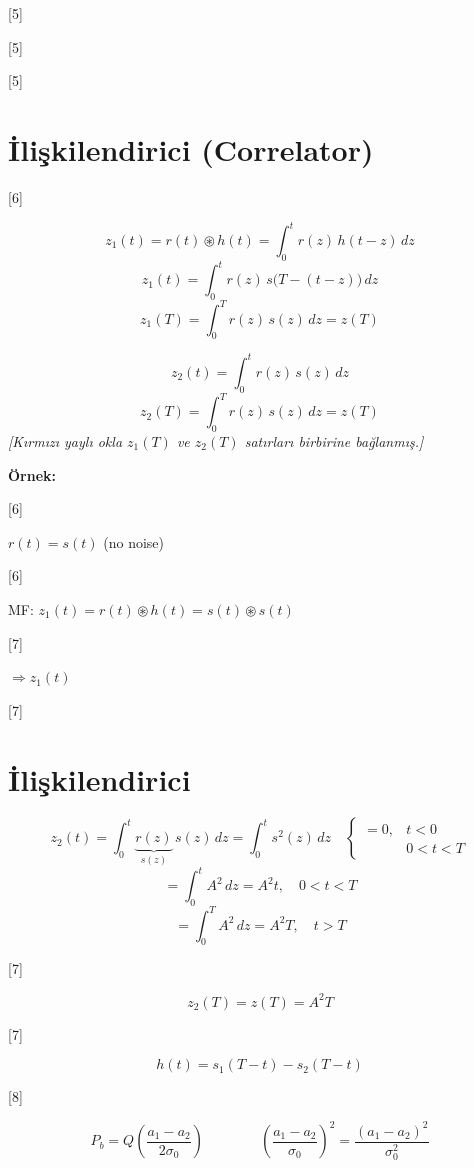\documentclass[11pt,a4paper]{article}
\begin{document}
[5]

[5]

[5]

\section{İlişkilendirici (Correlator)}

[6]

\[ z_1(t)=r(t)\circledast h(t)=\int_0^t r(z)\,h(t-z)\,dz \]
\[ z_1(t)=\int_0^t r(z)\,s\bigl(T-(t-z)\bigr)\,dz \]
\[ z_1(T)=\int_0^T r(z)\,s(z)\,dz=z(T) \]

\[ z_2(t)=\int_0^t r(z)\,s(z)\,dz \]
\[ z_2(T)=\int_0^T r(z)\,s(z)\,dz=z(T) \]
\textit{[Kırmızı yaylı okla $z_1(T)$ ve $z_2(T)$ satırları birbirine bağlanmış.]}

\textbf{Örnek:}

[6]

$r(t)=s(t)$ \qquad (no noise)

[6]

MF: $z_1(t)=r(t)\circledast h(t)=s(t)\circledast s(t)$

[7]

$\Rightarrow z_1(t)$

[7]

\section{İlişkilendirici}
\[ z_2(t)=\int_0^t \underbrace{r(z)}_{s(z)}\,s(z)\,dz=\int_0^t s^2(z)\,dz \quad \begin{cases} =0, & t<0 \\ & 0<t<T \end{cases} \]
\[ =\int_0^t A^2\,dz=A^2t,\quad 0<t<T \]
\[ =\int_0^T A^2\,dz=A^2T,\quad t>T \]

[7]

\[ z_2(T)=z(T)=A^2T \]

[7]

\[ h(t)=s_1(T-t)-s_2(T-t) \]

[8]

\[ P_b=Q\left(\frac{a_1-a_2}{2\sigma_0}\right) \qquad\qquad \left(\frac{a_1-a_2}{\sigma_0}\right)^2=\frac{(a_1-a_2)^2}{\sigma_0^2} \]
\end{document}
